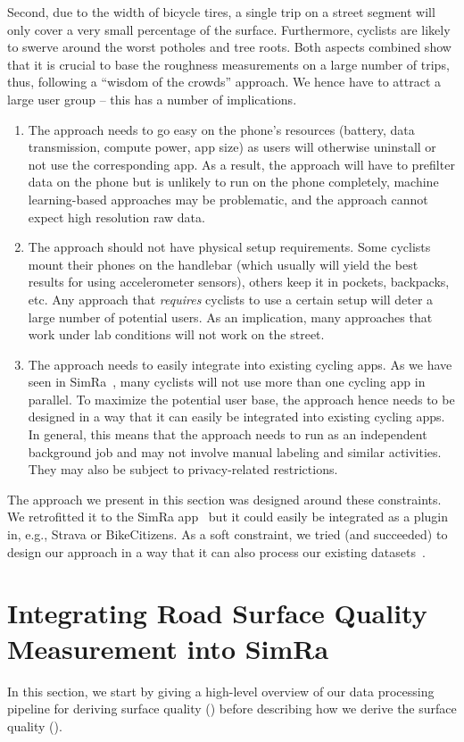 Second, due to the width of bicycle tires, a single trip on a street segment will only cover a very small percentage of the surface.
Furthermore, cyclists are likely to swerve around the worst potholes and tree roots.
Both aspects combined show that it is crucial to base the roughness measurements on a large number of trips, thus, following a ``wisdom of the crowds'' approach.
We hence have to attract a large user group -- this has a number of implications.
\begin{enumerate}
	\item The approach needs to go easy on the phone's resources (battery, data transmission, compute power, app size) as users will otherwise uninstall or not use the corresponding app. As a result, the approach will have to prefilter data on the phone but is unlikely to run on the phone completely, machine learning-based approaches may be problematic, and the approach cannot expect high resolution raw data.
	\item The approach should not have physical setup requirements. Some cyclists mount their phones on the handlebar (which usually will yield the best results for using accelerometer sensors), others keep it in pockets, backpacks, etc. Any approach that \emph{requires} cyclists to use a certain setup will deter a large number of potential users. As an implication, many approaches that work under lab conditions will not work on the street.
	\item The approach needs to easily integrate into existing cycling apps. As we have seen in SimRa~\cite{karakaya2020simra}, many cyclists will not use more than one cycling app in parallel. To maximize the potential user base, the approach hence needs to be designed in a way that it can easily be integrated into existing cycling apps. In general, this means that the approach needs to run as an independent background job and may not involve manual labeling and similar activities. They may also be subject to privacy-related restrictions.
\end{enumerate}

The approach we present in this section was designed around these constraints.
We retrofitted it to the SimRa app~\cite{karakaya2020simra} but it could easily be integrated as a plugin in, e.g., Strava or BikeCitizens.
As a soft constraint, we tried (and succeeded) to design our approach in a way that it can also process our existing datasets~\cite{dataset_simra_set1,dataset_simra_set2,dataset_simra_set3}.


\section{Integrating Road Surface Quality Measurement into SimRa}
\label{sec:data_processing_pipeline}
In this section, we start by giving a high-level overview of our data processing pipeline for deriving surface quality () before describing how we derive the surface quality ().

